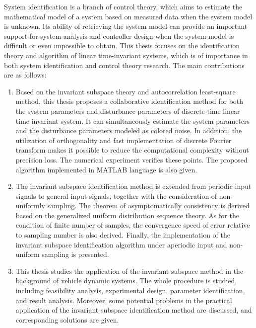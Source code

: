 \begin{eabstract}
  System identification is a branch of control theory, which aims to estimate the mathematical model of a system based on measured data when the system model is unknown.
  Its ability of retrieving the system model can provide an important support for system analysis and controller design when the system model is difficult or even impossible to obtain.
  This thesis focuses on the identification theory and algorithm of linear time-invariant systems, which is of importance in both system identification and control theory research.
  The main contributions are as follows:

  \begin{enumerate}[1.]
    \item Based on the invariant subspace theory and autocorrelation least-square method, this thesis proposes a collaborative identification method for both the system parameters and disturbance parameters of discrete-time linear time-invariant system.
    It can simultaneously estimate the system parameters and the disturbance parameters modeled as colored noise.
    In addition, the utilization of orthogonality and fast implementation of discrete Fourier transform makes it possible to reduce the computational complexity without precision loss.
    The numerical experiment verifies these points.
    The proposed algorithm implemented in MATLAB language is also given.

    \item The invariant subspace identification method is extended from periodic input signals to general input signals, together with the consideration of non-uniformly sampling.
    The theorem of asymptomatically consistency is derived based on the generalized uniform distribution sequence theory.
    As for the condition of finite number of samples, the convergence speed of error relative to sampling number is also derived.
    Finally, the implementation of the invariant subspace identification algorithm under aperiodic input and non-uniform sampling is presented.
    
    \item This thesis studies the application of the invariant subspace method in the background of vehicle dynamic systems.
    The whole procedure is studied, including feasibility analysis, experimental design, parameter identification, and result analysis.
    Moreover, some potential problems in the practical application of the invariant subspace identification method are discussed, and corresponding solutions are given.
  \end{enumerate}
\end{eabstract}

